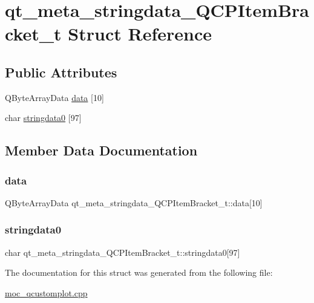 \hypertarget{structqt__meta__stringdata__QCPItemBracket__t}{}\section{qt\+\_\+meta\+\_\+stringdata\+\_\+\+Q\+C\+P\+Item\+Bracket\+\_\+t Struct Reference}
\label{structqt__meta__stringdata__QCPItemBracket__t}
\subsection*{Public Attributes}
\begin{DoxyCompactItemize}
\item 
Q\+Byte\+Array\+Data \mbox{\hyperlink{structqt__meta__stringdata__QCPItemBracket__t_a43e94e3d311baab0f40ef38c9a1869b9}{data}} \mbox{[}10\mbox{]}
\item 
char \mbox{\hyperlink{structqt__meta__stringdata__QCPItemBracket__t_a69c4efac85336d82d66b351f29e79864}{stringdata0}} \mbox{[}97\mbox{]}
\end{DoxyCompactItemize}


\subsection{Member Data Documentation}
\mbox{\label{structqt__meta__stringdata__QCPItemBracket__t_a43e94e3d311baab0f40ef38c9a1869b9}} 
\subsubsection{\texorpdfstring{data}{data}}
{\footnotesize\ttfamily Q\+Byte\+Array\+Data qt\+\_\+meta\+\_\+stringdata\+\_\+\+Q\+C\+P\+Item\+Bracket\+\_\+t\+::data\mbox{[}10\mbox{]}}

\mbox{\label{structqt__meta__stringdata__QCPItemBracket__t_a69c4efac85336d82d66b351f29e79864}} 
\subsubsection{\texorpdfstring{stringdata0}{stringdata0}}
{\footnotesize\ttfamily char qt\+\_\+meta\+\_\+stringdata\+\_\+\+Q\+C\+P\+Item\+Bracket\+\_\+t\+::stringdata0\mbox{[}97\mbox{]}}



The documentation for this struct was generated from the following file\+:\begin{DoxyCompactItemize}
\item 
\mbox{\hyperlink{moc__qcustomplot_8cpp}{moc\+\_\+qcustomplot.\+cpp}}\end{DoxyCompactItemize}
